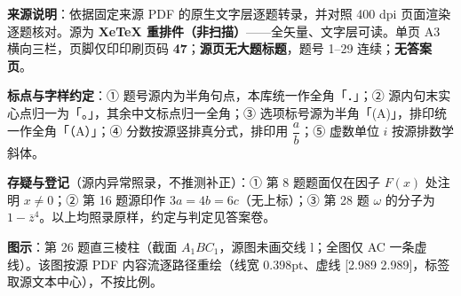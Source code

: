 


\begin{gktip}
\textbf{来源说明}：依据固定来源 PDF 的原生文字层逐题转录，并对照 400 dpi 页面渲染逐题核对。源为 \textbf{XeTeX 重排件（非扫描）}——全矢量、文字层可读。单页 A3 横向三栏，页脚仅印印刷页码 \textbf{47}；\textbf{源页无大题标题}，题号 1–29 连续；\textbf{无答案页}。

\textbf{标点与字样约定}：① 题号源内为半角句点，本库统一作全角「．」；② 源内句末实心点归一为「。」，其余中文标点归一全角；③ 选项标号源为半角「(A)」，排印统一作全角「（A）」；④ 分数按源竖排真分式，排印用 \(\dfrac{a}{b}\)；⑤ 虚数单位 \(i\) 按源排数学斜体。

\textbf{存疑与登记}（源内异常照录，不推测补正）：① 第 8 题题面仅在因子 \(F(x)\) 处注明 \(x\ne0\)；② 第 16 题源印作 \(3a=4b=6c\)（无上标）；③ 第 28 题 \(\omega\) 的分子为 \(1-\overline z^4\)。以上均照录原样，约定与判定见答案卷。

\textbf{图示}：第 26 题直三棱柱（截面 \(A_1BC_1\)，源图未画交线 l；全图仅 AC 一条虚线）。该图按源 PDF 内容流逐路径重绘（线宽 0.398pt、虚线 [2.989 2.989]，标签取源文本中心），不按比例。
\end{gktip}

